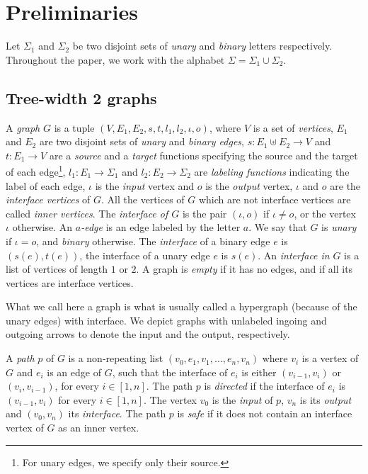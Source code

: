 \section{Preliminaries}\label{sec:prelim}

 Let $\Sigma_1$ and $\Sigma_2$ be two disjoint sets of \emph{unary} and \emph{binary} letters respectively. Throughout the paper, we work with the alphabet $\Sigma=\Sigma_1\cup \Sigma_2$. 
\subsection{Tree-width 2 graphs}



\begin{definition}[Graphs] 
 A \emph{graph} $G$ is  a tuple $(V,E_1,E_2, s, t, l_1, l_2, \iota, o)$, where $V$ is a set of \emph{vertices}, $E_1$ and $E_2$ are two disjoint sets  of \emph{unary} and \emph{binary edges}, $s:E_1\uplus E_2\to V$  and $t:E_1\to V$ are a \emph{source} and a \emph{target} functions specifying the source and the target of each edge\footnote{For unary edges, we specify only their source.}, $l_1:E_1\to \Sigma_1$ and $l_2:E_2\to \Sigma_2$ are \emph{labeling functions}  indicating the label of each edge,  $\iota$ is the  \emph{input} vertex and $o$ is the \emph{output} vertex, $\iota$ and $o$ are the \emph{interface vertices} of $G$. All the vertices of $G$ which are not interface vertices are called \emph{inner vertices}. The \emph{interface of $G$} is the pair $(\iota, o)$ if $\iota\neq o$, or the vertex $\iota$ otherwise.   An \emph{$a$-edge} is an edge labeled by the letter $a$. We say that $G$ is \emph{unary} if $\iota=o$, and \emph{binary} otherwise. The \emph{interface} of a binary edge $e$ is $(s(e),t(e))$, the interface of a unary edge $e$ is $s(e)$. An \emph{interface in} $G$ is a list of vertices of length $1$ or $2$. A  graph is \emph{empty} if it has no edges, and if all its vertices are interface vertices.  
 \end{definition}
   \begin{remark} What we call here a graph is what is usually called a hypergraph (because of the unary edges) with interface.  We depict graphs  with unlabeled ingoing and outgoing arrows to denote the input and the output, respectively. 
   \end{remark}
   \begin{definition}[Paths]
   A \emph{path} $p$ of $G$ is a non-repeating list $(v_0,e_1,v_1,\dots,e_n,v_n)$ where $v_i$ is a vertex of $G$ and $e_i$ is an edge of $G$, such that the interface of $e_i$ is either $(v_{i-1}, v_{i})$ or $(v_{i},v_{i-1})$, for every $i\in[1,n]$. The path $p$ is \emph{directed} if the interface of $e_i$ is  $(v_{i-1}, v_{i})$ for every $i\in[1,n]$. The vertex $v_0$ is the \emph{input} of $p$, $v_n$  is its \emph{output} and $(v_0,v_n)$ its \emph{interface}. 
   The path $p$ is \emph{safe} if it does not contain an interface vertex of $G$ as an inner vertex. 
   \end{definition} 
